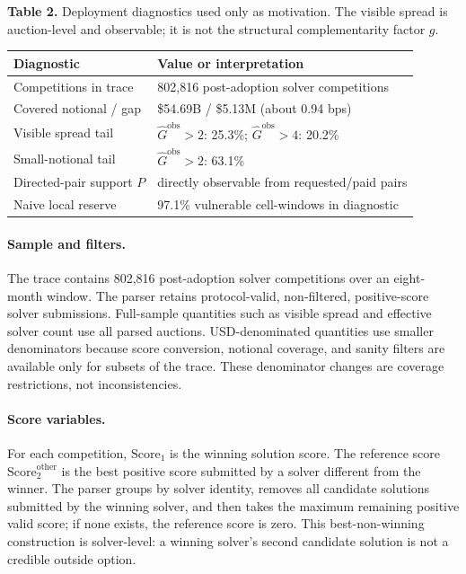 \begin{center}
\footnotesize
\begin{minipage}{0.92\textwidth}
\centering
\textbf{Table 2.} Deployment diagnostics used only as motivation. The
visible spread is auction-level and observable; it is not the structural
complementarity factor $g$.
\medskip

\begin{tabular}{@{}ll@{}}
\toprule
Diagnostic & Value or interpretation\\
\midrule
Competitions in trace & 802,816 post-adoption solver competitions\\
Covered notional / gap & \$54.69B / \$5.13M (about 0.94 bps)\\
Visible spread tail & $\widehat G^{\mathrm{obs}}>2$: 25.3\%;
  $\widehat G^{\mathrm{obs}}>4$: 20.2\%\\
Small-notional tail & $\widehat G^{\mathrm{obs}}>2$: 63.1\%\\
Directed-pair support $P$ & directly observable from requested/paid pairs\\
Naive local reserve & 97.1\% vulnerable cell-windows in diagnostic\\
\bottomrule
\end{tabular}
\end{minipage}
\end{center}

\paragraph{Sample and filters.}
The trace contains 802,816 post-adoption solver competitions over an
eight-month window. The parser retains protocol-valid, non-filtered,
positive-score solver submissions. Full-sample quantities such as visible
spread and effective solver count use all parsed auctions. USD-denominated
quantities use smaller denominators because score conversion, notional
coverage, and sanity filters are available only for subsets of the trace.
These denominator changes are coverage restrictions, not inconsistencies.

\paragraph{Score variables.}
For each competition, $\mathrm{Score}_1$ is the winning solution score.
The reference score $\mathrm{Score}^{\mathrm{other}}_2$ is the best
positive score submitted by a solver different from the winner. The parser
groups by solver identity, removes all candidate solutions submitted by
the winning solver, and then takes the maximum remaining positive valid
score; if none exists, the reference score is zero. This best-non-winning
construction is solver-level: a winning solver's second candidate solution
is not a credible outside option.

